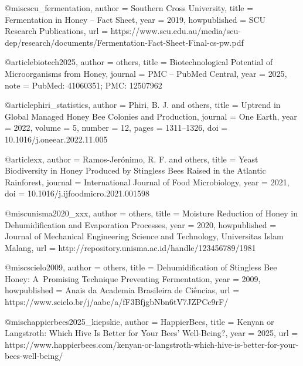 @misc{scu_fermentation,
  author       = {{Southern Cross University}},
  title        = {{Fermentation in Honey -- Fact Sheet}},
  year         = {2019},
  howpublished = {SCU Research Publications},
  url          = {https://www.scu.edu.au/media/scu-dep/research/documents/Fermentation-Fact-Sheet-Final-cs-pw.pdf}
}

@article{biotech2025,
  author  = {others},
  title   = {{Biotechnological Potential of Microorganisms
              from Honey}},
  journal = {PMC -- PubMed Central},
  year    = {2025},
  note    = {PubMed: 41060351; PMC: 12507962}
}






@article{phiri_statistics,
  author  = {Phiri, B. J. and others},
  title   = {{Uptrend in Global Managed Honey Bee Colonies and Production}},
  journal = {One Earth},
  year    = {2022},
  volume  = {5},
  number  = {12},
  pages   = {1311--1326},
  doi     = {10.1016/j.oneear.2022.11.005}
}

@article{xx,
  author  = {Ramos-Jer{\'o}nimo, R. F. and others},
  title   = {{Yeast Biodiversity in Honey Produced by Stingless Bees
              Raised in the Atlantic Rainforest}},
  journal = {International Journal of Food Microbiology},
  year    = {2021},
  doi     = {10.1016/j.ijfoodmicro.2021.001598}
}




@misc{unisma2020_xxx,
  author       = {others},
  title        = {{Moisture Reduction of Honey in Dehumidification
                   and Evaporation Processes}},
  year         = {2020},
  howpublished = {Journal of Mechanical Engineering Science and Technology,
                   Universitas Islam Malang},
  url          = {http://repository.unisma.ac.id/handle/123456789/1981}
}

@misc{scielo2009,
  author       = {others},
  title        = {{Dehumidification of Stingless Bee Honey:
                   A~Promising Technique Preventing Fermentation}},
  year         = {2009},
  howpublished = {Anais da Academia Brasileira de Ci\^{e}ncias},
  url          = {https://www.scielo.br/j/aabc/a/fF3BfjgbNbn6tV7JZPCc9rF/}
}



@misc{happierbees2025_kiepskie,
  author       = {{HappierBees}},
  title        = {{Kenyan or Langstroth: Which Hive Is Better
                   for Your Bees' Well-Being?}},
  year         = {2025},
  url          = {https://www.happierbees.com/kenyan-or-langstroth-which-hive-is-better-for-your-bees-well-being/}
}

